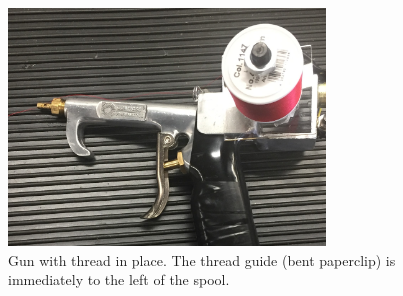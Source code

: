 \documentclass[letterpaper,12pt]{article}
\begin{document}
\begin{figure} [h!]
		\centering
		\includegraphics[width=0.75\textwidth]{gun_thread_up_zoom.JPG}
		\caption{Gun with thread in place. The thread guide (bent paperclip) is immediately to the left of the spool.}
		\label{fig:start_thread}
\end{figure}
\end{document}
